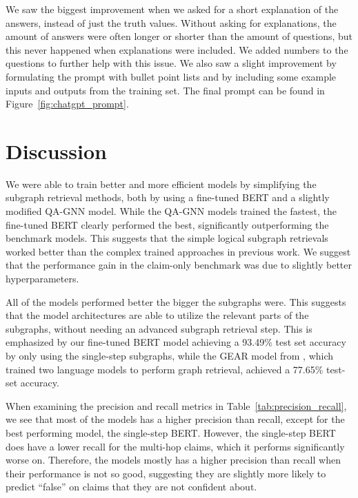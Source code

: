 \documentclass[11pt]{article}
\begin{document}


We saw the biggest improvement when we asked for a short explanation of the answers, instead of just the truth values. Without asking for explanations, the amount of answers were often longer or shorter than the amount of questions, but this never happened when explanations were included. We added numbers to the questions to further help with this issue. We also saw a slight improvement by formulating the prompt with bullet point lists and by including some example inputs and outputs from the training set. The final prompt can be found in Figure~\ref{fig:chatgpt_prompt}.

\section{Discussion}

We were able to train better and more efficient models by simplifying the subgraph retrieval methods, both by using a fine-tuned BERT and a slightly modified QA-GNN model. While the QA-GNN models trained the fastest, the fine-tuned BERT clearly performed the best, significantly outperforming the benchmark models. This suggests that the simple logical subgraph retrievals worked better than the complex trained approaches in previous work. We suggest that the performance gain in the claim-only benchmark was due to slightly better hyperparameters.

All of the models performed better the bigger the subgraphs were. This suggests that the model architectures are able to utilize the relevant parts of the subgraphs, without needing an advanced subgraph retrieval step. This is emphasized by our fine-tuned BERT model achieving a 93.49\% test set accuracy by only using the single-step subgraphs, while the GEAR model from \citet{kim2023factkg}, which trained two language models to perform graph retrieval, achieved a 77.65\% test-set accuracy.

When examining the precision and recall metrics in Table~\ref{tab:precision_recall}, we see that most of the models has a higher precision than recall, except for the best performing model, the single-step BERT. However, the single-step BERT does have a lower recall for the multi-hop claims, which it performs significantly worse on. Therefore, the models mostly has a higher precision than recall when their performance is not so good, suggesting they are slightly more likely to predict ``false'' on claims that they are not confident about.
\end{document}
